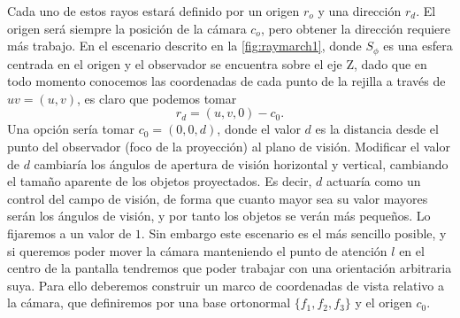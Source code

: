 Cada uno de estos rayos estará definido por un origen $r_o$ y una dirección $r_d$. El origen será siempre la posición de la cámara $c_o$, pero obtener la dirección requiere más trabajo. En el escenario descrito en la \autoref{fig:raymarch1}, donde $S_{\phi}$ es una esfera centrada en el origen y el observador se encuentra sobre el eje Z, dado que en todo momento conocemos las coordenadas de cada punto de la rejilla a través de $uv = (u,v)$, es claro que podemos tomar
$$r_d = (u,v,0) - c_0.$$ 
Una opción sería tomar $c_0 = (0,0,d)$, donde el valor $d$ es la distancia desde el punto del observador (foco de la proyección) al plano de visión. Modificar el valor de $d$ cambiaría los ángulos de apertura de visión horizontal y vertical, cambiando el tamaño aparente de los objetos proyectados. Es decir, $d$ actuaría como un control del campo de visión, de forma que cuanto mayor sea su valor mayores serán los ángulos de visión, y por tanto los objetos se verán más pequeños. Lo fijaremos a un valor de $1$. Sin embargo este escenario es el más sencillo posible, y si queremos poder mover la cámara manteniendo el punto de atención $l$ en el centro de la pantalla tendremos que poder trabajar con una orientación arbitraria suya. Para ello deberemos construir un marco de coordenadas de vista relativo a la cámara, que definiremos por una base ortonormal $\{f_1,f_2,f_3\}$ y el origen $c_0$.\newline

